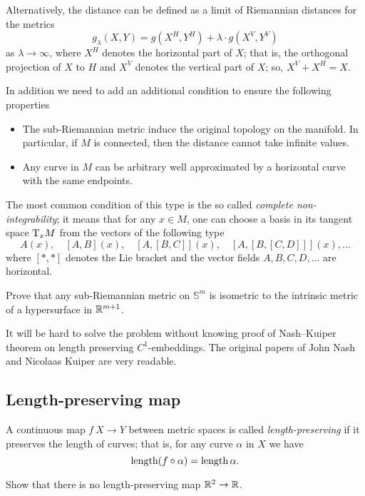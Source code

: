 Alternatively, the distance can be defined as a limit of Riemannian distances 
for the metrics 
\[g_\lambda(X,Y)=g(X^H,Y^H)+\lambda\cdot g(X^V,Y^V)\] 
as $\lambda\to \infty$,
where $X^H$ denotes the horizontal part of $X$;
that is, the orthogonal projection of $X$ to $H$
and $X^V$ denotes the vertical part of $X$;
so, $X^V+X^H=X$.

In addition we need to add an additional condition to ensure the following properties 
\begin{itemize}
\item The sub-Riemannian metric induce the original topology on the manifold. 
In particular, if $M$ is connected, then the distance cannot take infinite values.
\item Any curve in $M$ can be arbitrary well approximated by a horizontal curve with the same endpoints.
\end{itemize}
The most common condition of this type is the so called {}\emph{complete non-integrability};
it means that for any $x\in M$, 
one can choose a basis in its tangent space $\mathrm{T}_xM$
from the vectors of the following type
\[A(x),\quad  [A,B](x),\quad [A,[B,C]](x),\quad [A,[B,[C,D]]](x),\dots\] 
where $[{*},{*}]$ denotes the Lie bracket 
and the vector fields $A,B,C,D, \dots$ are horizontal.

\begin{pr}
Prove that any sub-Riemannian metric 
on $\mathbb{S}^m$ is isometric to the intrinsic metric of a hypersurface in $\mathbb{R}^{m+1}$.
\end{pr}


It will be hard to solve the problem without knowing proof of Nash--Kuiper theorem on length preserving $C^1$-embeddings.
The original papers of John Nash 
and Nicolaas Kuiper \cite[see][]{nash,kuiper} are very readable.

\subsection*{Length-preserving map\thm}
\label{two2one} 

A continuous map $f\:X\to Y$ between metric spaces is called \emph{length-preserving} if it preserves the length of curves; 
that is, for any curve $\alpha$ in $X$ we have
\[\operatorname{\rm length}(f\circ\alpha)=\operatorname{\rm length}\alpha.\]

\begin{pr}
Show that there is no length-preserving map $\mathbb{R}^2\to \mathbb{R}$.
\end{pr}


